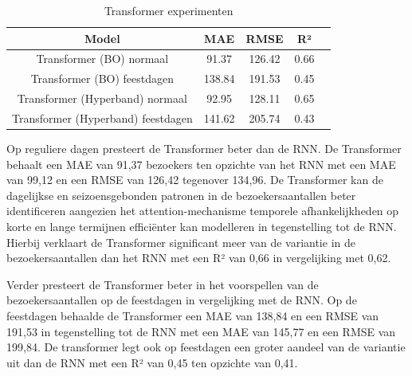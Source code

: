 \begin{table}[H]
    \centering
    \begin{tabular}{|c|c|c|c|c|}
        \hline
        \textbf{Model} & MAE & RMSE & R² \\ \hline
        Transformer (BO) normaal & 91.37 & 126.42 & 0.66  \\ \hline
        Transformer (BO) feestdagen & 138.84 & 191.53 & 0.45  \\ \hline
        Transformer (Hyperband) normaal & 92.95 & 128.11 & 0.65  \\ \hline
        Transformer (Hyperband) feestdagen & 141.62 & 205.74 & 0.43 \\ \hline
    \end{tabular}
    \caption{Transformer experimenten}
\end{table}

Op reguliere dagen presteert de Transformer beter dan de RNN. De Transformer behaalt een MAE van 91,37 bezoekers ten opzichte van het RNN met een MAE van 99,12 en een RMSE van 126,42 tegenover 134,96. De Transformer kan de dagelijkse en seizoensgebonden patronen in de bezoekersaantallen beter identificeren aangezien het attention-mechanisme temporele afhankelijkheden op korte en lange termijnen efficiënter kan modelleren in tegenstelling tot de RNN. Hierbij verklaart de Transformer significant meer van de variantie in de bezoekersaantallen dan het RNN met een R² van 0,66 in vergelijking met 0,62.

Verder presteert de Transformer beter in het voorspellen van de bezoekersaantallen op de feestdagen in vergelijking met de RNN. Op de feestdagen behaalde de Transformer een MAE van 138,84 en een RMSE van 191,53 in tegenstelling tot de RNN met een MAE van 145,77 en een RMSE van 199,84. De transformer legt ook op feestdagen een groter aandeel van de variantie uit dan de RNN met een R² van 0,45 ten opzichte van 0,41.

